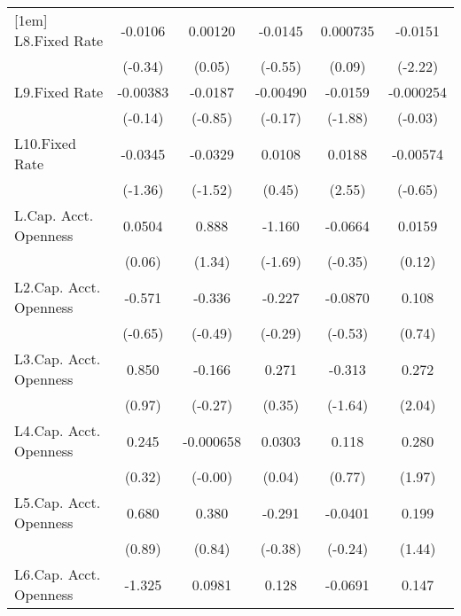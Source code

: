 {\begin{longtable}{l*{5}{c}}
[1em]
L8.Fixed Rate   &  -0.0106         &  0.00120         &  -0.0145         & 0.000735         &  -0.0151\sym{*}  \\
                &  (-0.34)         &   (0.05)         &  (-0.55)         &   (0.09)         &  (-2.22)         \\
[1em]
L9.Fixed Rate   & -0.00383         &  -0.0187         & -0.00490         &  -0.0159         &-0.000254         \\
                &  (-0.14)         &  (-0.85)         &  (-0.17)         &  (-1.88)         &  (-0.03)         \\
[1em]
L10.Fixed Rate  &  -0.0345         &  -0.0329         &   0.0108         &   0.0188\sym{*}  & -0.00574         \\
                &  (-1.36)         &  (-1.52)         &   (0.45)         &   (2.55)         &  (-0.65)         \\
[1em]
L.Cap. Acct. Openness&   0.0504         &    0.888         &   -1.160         &  -0.0664         &   0.0159         \\
                &   (0.06)         &   (1.34)         &  (-1.69)         &  (-0.35)         &   (0.12)         \\
[1em]
L2.Cap. Acct. Openness&   -0.571         &   -0.336         &   -0.227         &  -0.0870         &    0.108         \\
                &  (-0.65)         &  (-0.49)         &  (-0.29)         &  (-0.53)         &   (0.74)         \\
[1em]
L3.Cap. Acct. Openness&    0.850         &   -0.166         &    0.271         &   -0.313         &    0.272\sym{*}  \\
                &   (0.97)         &  (-0.27)         &   (0.35)         &  (-1.64)         &   (2.04)         \\
[1em]
L4.Cap. Acct. Openness&    0.245         &-0.000658         &   0.0303         &    0.118         &    0.280         \\
                &   (0.32)         &  (-0.00)         &   (0.04)         &   (0.77)         &   (1.97)         \\
[1em]
L5.Cap. Acct. Openness&    0.680         &    0.380         &   -0.291         &  -0.0401         &    0.199         \\
                &   (0.89)         &   (0.84)         &  (-0.38)         &  (-0.24)         &   (1.44)         \\
[1em]
L6.Cap. Acct. Openness&   -1.325         &   0.0981         &    0.128         &  -0.0691         &    0.147         \\

\end{longtable}}
